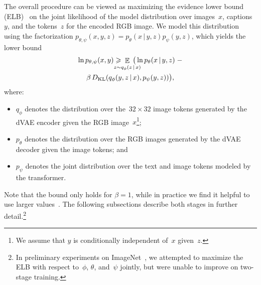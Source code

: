 \documentclass{article}
\newcommand{\given}{\,|\,}{}
\begin{document}
The overall procedure can be viewed as maximizing the evidence lower bound (ELB)~\cite{kingma2013auto,rezende2014stochastic} on the joint likelihood of the model distribution over images~$x$, captions~$y$, and the tokens~$z$ for the encoded RGB image. We model this distribution using the factorization $p_{\theta, \psi}(x, y, z) = p_\theta(x \given y, z) p_\psi(y, z)$, which yields the lower bound
\begin{multline}
    \ln p_{\theta, \psi}(x, y) \geqslant \!\!\!\!\!\!\!\! \mathop{\mathbb{E}}_{\substack{\vspace{0.1mm} \\ z \sim q_\phi(z \given x)}} \!\!\!\!\!\!\!\! \big( \ln p_\theta(x \given y, z)
    \;- \\ 
    \beta\, D_{\mathrm{KL}}(q_\phi(y, z \given x), p_\psi(y,z)) \big), \label{eq:elb}
\end{multline}
where:
\begin{itemize}
    \item $q_\phi$ denotes the distribution over the~$32 \times 32$ image tokens generated by the dVAE encoder given the RGB image~$x$\footnote{We assume that $y$ is conditionally independent of~$x$ given~$z$.};
    \item $p_\theta$ denotes the distribution over the RGB images generated by the dVAE decoder given the image tokens; and
    \item $p_\psi$ denotes the joint distribution over the text and image tokens modeled by the transformer.
\end{itemize}
Note that the bound only holds for $\beta=1$, while in practice we find it helpful to use larger values~\cite{higgins2016beta}. The following subsections describe both stages in further detail.\footnote{In preliminary experiments on ImageNet~\cite{deng2009imagenet}, we attempted to maximize the ELB with respect to~$\phi$, $\theta$, and~$\psi$ jointly, but were unable to improve on two-stage training.}
\end{document}
